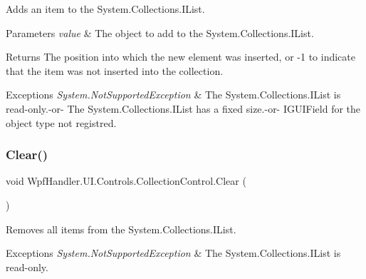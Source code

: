 Adds an item to the System.\+Collections.\+I\+List. 


\begin{DoxyParams}{Parameters}
{\em value} & The object to add to the System.\+Collections.\+I\+List.\\
\hline
\end{DoxyParams}
\begin{DoxyReturn}{Returns}
The position into which the new element was inserted, or -\/1 to indicate that the item was not inserted into the collection. 
\end{DoxyReturn}

\begin{DoxyExceptions}{Exceptions}
{\em System.\+Not\+Supported\+Exception} & The System.\+Collections.\+I\+List is read-\/only.-\/or-\/ The System.\+Collections.\+I\+List has a fixed size.-\/or-\/ I\+G\+U\+I\+Field for the object type not registred. \\
\hline
\end{DoxyExceptions}
\mbox{\label{class_wpf_handler_1_1_u_i_1_1_controls_1_1_collection_control_a1f1a7fd996c4e15ec7fe3b2724e962d3}} 
\subsubsection{\texorpdfstring{Clear()}{Clear()}}
{\footnotesize\ttfamily void Wpf\+Handler.\+U\+I.\+Controls.\+Collection\+Control.\+Clear (\begin{DoxyParamCaption}{ }\end{DoxyParamCaption})}



Removes all items from the System.\+Collections.\+I\+List. 


\begin{DoxyExceptions}{Exceptions}
{\em System.\+Not\+Supported\+Exception} & The System.\+Collections.\+I\+List is read-\/only. \\
\hline
\end{DoxyExceptions}
\mbox{\label{class_wpf_handler_1_1_u_i_1_1_controls_1_1_collection_control_a2372fa8b10c175bb81d5901f36cbf8f7}} 
